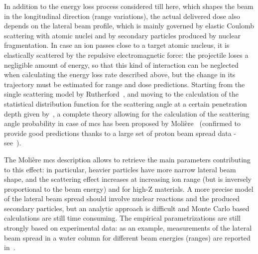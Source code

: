 In addition to the energy loss process considered till here,   which shapes the beam in the longitudinal direction (range variations), the actual delivered dose also depends on the lateral beam profile, which is mainly governed by elastic Coulomb scattering with atomic nuclei and by secondary particles produced by nuclear fragmentation. 
In case an ion passes close to a target atomic nucleus, it is elastically scattered by the repulsive electromagnetic force: the projectile loses a negligible amount of energy, so that this kind of interaction can be neglected when calculating the energy loss rate described above, but the change in its trajectory must be estimated for range and dose predictions. %
Starting from the single scattering model by Rutherford~\parencite{Rutherford1911}, and moving to the calculation of the statistical distribution function for the scattering angle at a certain penetration depth given by~\cite{Bothe1921}, a complete theory allowing for the calculation of the scattering angle probability in case of \gls{mcs} has been proposed by Moli\`{e}re~\parencite{Moliere1948} (confirmed to provide good predictions thanks to a large set of proton beam spread data - see~\cite{Gottschalk1993}). %


The Moli\`{e}re \gls{mcs} description allows to retrieve the main parameters contributing to this effect: in particular, heavier particles have more narrow lateral beam shape, and the scattering effect increases at increasing ion range (but is inversely proportional to the beam energy) and for high-Z materials. A more precise model of the lateral beam spread should involve nuclear reactions and the produced secondary particles, but an analytic approach is difficult and Monte Carlo based calculations are still time consuming. The empirical parametrizations are still strongly based on experimental data: as an example, measurements of the lateral beam spread in a water column for different beam energies (ranges) are reported in~\cite{Pedroni2005}.  

